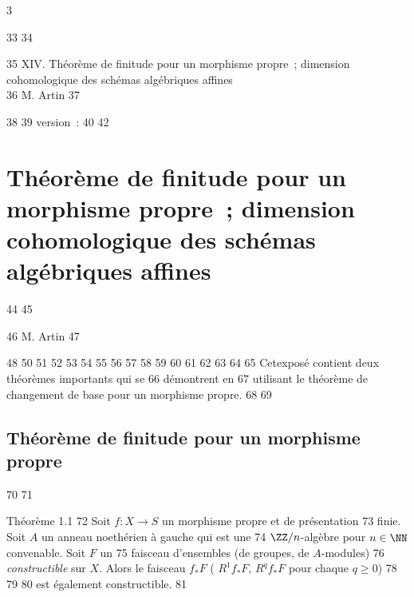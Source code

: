 3	\documentclass[10pt]{../fichiers-configuration-latex/smfart}
\begin{document}
    33	
    34	\begin{center}
    35	XIV. Théorème de finitude pour un morphisme propre ; dimension cohomologique des schémas algébriques affines\\
    36	M. Artin 
    37	\end{center}
    38	
    39	version : \showgitstatus{}
    40		
    42		\chapter{Théorème de finitude pour un morphisme propre ; dimension cohomologique des schémas algébriques affines}
    44	%
    45	\begin{center}
    46	M. Artin 
    47	\end{center}
    48		
    50	\setcounter{pageoriginal}{144}
    51	
    52	\newcommand{\degtr}{{\rm deg.tr.\ }}    %
    53	
    54	%
    55	
    56	%
    57	%
    58	%
    59	%
    60	
    61	%
    62	
    63	%
    64	
    65	Cet\pageoriginale exposé contient deux théorèmes importants qui se
    66	démontrent en 
    67	utilisant le théorème de changement de base pour un morphisme propre.
    68	
    69	\section{Théorème de finitude pour un morphisme propre}
    70	
    71	\begin{enonce*}{Théorème 1.1}
    72	Soit $f:X\rightarrow S$ un morphisme propre et de présentation
    73	finie. Soit $A$ un anneau noethérien à gauche qui est une
    74	$\ZZ/n$-algèbre pour $n\in \NN$ convenable. Soit $F$ un
    75	faisceau d'ensembles (\resp de groupes, \resp de $A$-modules)
    76	\emph{constructible} sur $X$. Alors le faisceau $f_{\ast}F$ (	$R^1f_{\ast}F$, \resp $R^qf_{\ast}F$ pour chaque $q\geq 0$) 
    78	%
    79	%
    80	est également constructible.
    81	\end{enonce*}
\end{document}
